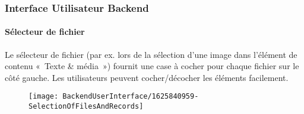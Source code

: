 %

\begin{frame}[fragile]
	\frametitle{Interface Utilisateur Backend}
	\framesubtitle{Sélecteur de fichier}

    Le sélecteur de fichier (par ex. lors de la sélection d'une image dans l'élément
    de contenu «~Texte \& média~») fournit une case à cocher pour chaque fichier sur le côté gauche.
    Les utilisateurs peuvent cocher/décocher les éléments facilement.

	\begin{figure}
		\texttt{[image: BackendUserInterface/1625840959-SelectionOfFilesAndRecords]}
	\end{figure}

\end{frame}

